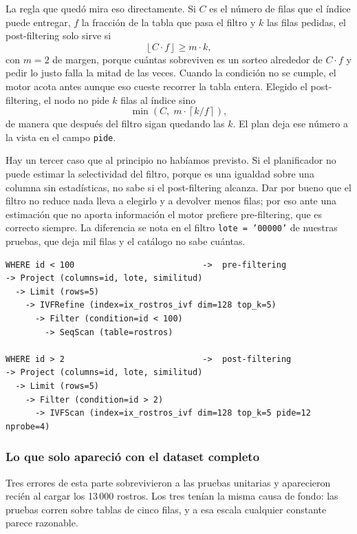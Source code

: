 \documentclass[a4paper,12pt]{article}
\begin{document}
La regla que quedó mira eso directamente. Si $C$ es el número de filas que el
índice puede entregar, $f$ la fracción de la tabla que pasa el filtro y $k$ las
filas pedidas, el post-filtering solo sirve si
\begin{equation}
    \left\lfloor C \cdot f \right\rfloor \ge m \cdot k ,
\end{equation}
con $m = 2$ de margen, porque cuántas sobreviven es un sorteo alrededor de
$C \cdot f$ y pedir lo justo falla la mitad de las veces. Cuando la condición no
se cumple, el motor acota antes aunque eso cueste recorrer la tabla entera.
Elegido el post-filtering, el nodo no pide $k$ filas al índice sino
\begin{equation}
    \min\left(C,\; m \cdot \left\lceil k / f \right\rceil\right),
\end{equation}
de manera que después del filtro sigan quedando las $k$. El plan deja ese número
a la vista en el campo \texttt{pide}.

Hay un tercer caso que al principio no habíamos previsto. Si el planificador no
puede estimar la selectividad del filtro, porque es una igualdad sobre una
columna sin estadísticas, no sabe si el post-filtering alcanza. Dar por bueno que
el filtro no reduce nada lleva a elegirlo y a devolver menos filas; por eso ante
una estimación que no aporta información el motor prefiere pre-filtering, que es
correcto siempre. La diferencia se nota en el filtro \texttt{lote = '00000'} de
nuestras pruebas, que deja mil filas y el catálogo no sabe cuántas.

\begin{lstlisting}[caption={Los dos planes para la misma foto de consulta}]
WHERE id < 100                          ->  pre-filtering
-> Project (columns=id, lote, similitud)
  -> Limit (rows=5)
    -> IVFRefine (index=ix_rostros_ivf dim=128 top_k=5)
      -> Filter (condition=id < 100)
        -> SeqScan (table=rostros)

WHERE id > 2                            ->  post-filtering
-> Project (columns=id, lote, similitud)
  -> Limit (rows=5)
    -> Filter (condition=id > 2)
      -> IVFScan (index=ix_rostros_ivf dim=128 top_k=5 pide=12 nprobe=4)
\end{lstlisting}

\subsubsection{Lo que solo apareció con el dataset completo}

Tres errores de esta parte sobrevivieron a las pruebas unitarias y aparecieron
recién al cargar los 13\,000 rostros. Los tres tenían la misma causa de fondo:
las pruebas corren sobre tablas de cinco filas, y a esa escala cualquier
constante parece razonable.
\end{document}
